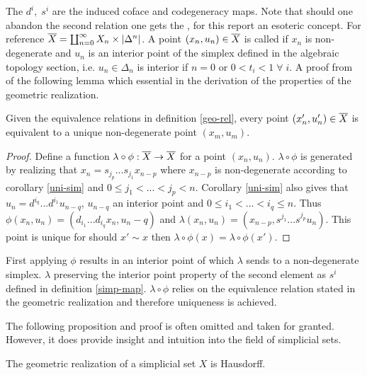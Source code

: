 \documentclass[../../main.tex]{subfiles}
\begin{document}
    The $d^i,\; s^i$ are the induced coface and codegeneracy maps. Note that should one abandon the second relation one gets the , for this report an esoteric concept. For reference $\bigGeom X = \coprod_{n=0}^{\infty} X_n \times \geom[\Delta^n]$. A point $(x_n,u_n)\in \bigGeom X$ is called  if $x_n$ is non-degenerate and $u_n$ is an interior point of the simplex defined in the algebraic topology section, i.e. $u_n\in \Delta_n$ is interior if $ n=0$ or $ 0< t_i < 1 \;\forall\; i$. A proof from \cite{simp-may} of the following lemma which essential in the derivation of the properties of the geometric realization.

    \begin{lemma}\label{deg-rep}
        Given the equivalence relations in definition \ref{geo-rel}, every point $\left(x_n',u_n'\right)\in\bigGeom X$ is equivalent to a unique non-degenerate point $\left(x_m,u_m\right)$.
    \end{lemma}

    \begin{proof}    
        Define a function $\lambda\circ\phi:\bigGeom X \to \bigGeom X$ for a point $(x_n,u_n)$. $\lambda\circ\phi$ is generated by realizing that $x_n=s_{j_p}...s_{j_1}x_{n-p}$ where $x_{n-p}$ is non-degenerate according to corollary \ref{uni-sim} and $0\leq j_1<...<j_p<n$. Corollary \ref{uni-sim} also gives that $u_n=d^{i_q}...d^{i_1}u_{n-q}$, $u_{n-q}$ an interior point and $0\leq i_1<...<i_q\leq n$. Thus $\phi(x_n,u_n)=(d_{i_1}...d_{i_q}x_n,u_n-q)$ and $\lambda(x_n,u_n)=(x_{n-p},s^{j_1}...s^{j_p}u_n)$. This point is unique for should $x'\sim x$ then $\lambda\circ\phi(x)=\lambda\circ\phi(x')$.
    \end{proof}

    First applying $\phi$ results in an interior point of which $\lambda$ sends to a non-degenerate simplex. $\lambda$ preserving the interior point property of the second element as $s^i$ defined in definition \ref{simp-map}. $\lambda\circ\phi$ relies on the equivalence relation stated in the geometric realization and therefore uniqueness is achieved. 

    The following proposition and proof is often omitted and taken for granted. However, it does provide insight and intuition into the field of simplicial sets. 

    \begin{proposition}
        The geometric realization of a simplicial set $X$ is Hausdorff.
    \end{proposition}
\end{document}
